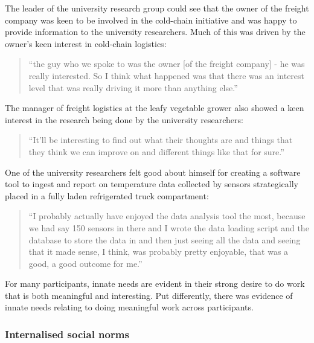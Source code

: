 The leader of the university research group could see that the owner of the freight company was keen to be involved in the cold-chain initiative and was happy to provide information to the university researchers. Much of this was driven by the owner's keen interest in cold-chain logistics:

\begin{quote}
\small
\enquote{the guy who we spoke to was the owner [of the freight company] - he was really interested. So I think what happened was that there was an interest level that was really driving it more than anything else.} \\
\end{quote}

The manager of freight logistics at the leafy vegetable grower also showed a keen interest in the research being done by the university researchers:

\begin{quote}
\small
\enquote{It'll be interesting to find out what their thoughts are and things that they think we can improve on and different things like that for sure.} \\
\end{quote}

One of the university researchers felt good about himself for creating a software tool to ingest and report on temperature data collected by sensors strategically placed in a fully laden refrigerated truck compartment:

\begin{quote}
\small
\enquote{I probably actually have enjoyed the data analysis tool the most, because we had say 150 sensors in there and I wrote the data loading script and the database to store the data in and then just seeing all the data and seeing that it made sense, I think, was probably pretty enjoyable, that was a good, a good outcome for me.} \\
\end{quote}

For many participants, innate needs are evident in their strong desire to do work that is both meaningful and interesting. Put differently, there was evidence of innate needs relating to doing meaningful work across participants. 

\subsubsection{Internalised social norms}

